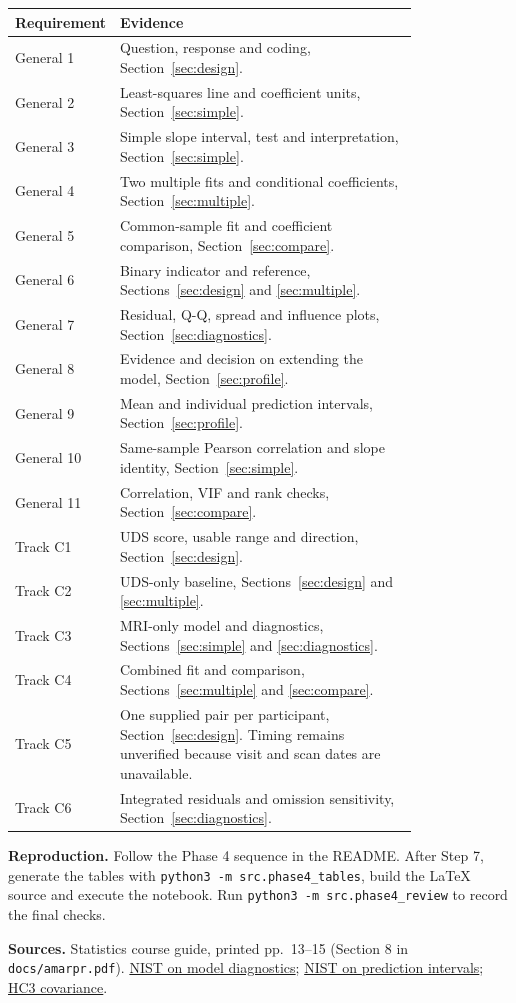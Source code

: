 \documentclass[11pt]{article}
\begin{document}
\begin{center}\small\setlength{\tabcolsep}{4pt}\renewcommand{\arraystretch}{1.13}
\begin{tabular}{@{}lp{0.80\linewidth}@{}}\toprule
Requirement & Evidence\\\midrule
General 1 & Question, response and coding, Section~\ref{sec:design}.\\
General 2 & Least-squares line and coefficient units, Section~\ref{sec:simple}.\\
General 3 & Simple slope interval, test and interpretation, Section~\ref{sec:simple}.\\
General 4 & Two multiple fits and conditional coefficients, Section~\ref{sec:multiple}.\\
General 5 & Common-sample fit and coefficient comparison, Section~\ref{sec:compare}.\\
General 6 & Binary indicator and reference, Sections~\ref{sec:design} and \ref{sec:multiple}.\\
General 7 & Residual, Q-Q, spread and influence plots, Section~\ref{sec:diagnostics}.\\
General 8 & Evidence and decision on extending the model, Section~\ref{sec:profile}.\\
General 9 & Mean and individual prediction intervals, Section~\ref{sec:profile}.\\
General 10 & Same-sample Pearson correlation and slope identity, Section~\ref{sec:simple}.\\
General 11 & Correlation, VIF and rank checks, Section~\ref{sec:compare}.\\
Track C1 & UDS score, usable range and direction, Section~\ref{sec:design}.\\
Track C2 & UDS-only baseline, Sections~\ref{sec:design} and \ref{sec:multiple}.\\
Track C3 & MRI-only model and diagnostics, Sections~\ref{sec:simple} and \ref{sec:diagnostics}.\\
Track C4 & Combined fit and comparison, Sections~\ref{sec:multiple} and \ref{sec:compare}.\\
Track C5 & One supplied pair per participant, Section~\ref{sec:design}. Timing remains unverified because visit and scan dates are unavailable.\\
Track C6 & Integrated residuals and omission sensitivity, Section~\ref{sec:diagnostics}.\\
\bottomrule\end{tabular}\end{center}

\textbf{Reproduction.} Follow the Phase 4 sequence in the README. After Step 7, generate the tables with \texttt{python3 -m src.phase4\_tables}, build the LaTeX source and execute the notebook. Run \texttt{python3 -m src.phase4\_review} to record the final checks.

\textbf{Sources.} Statistics course guide, printed pp.\ 13--15 (Section 8 in \texttt{docs/amarpr.pdf}). 
\href{https://www.itl.nist.gov/div898/handbook/pmd/section4/pmd44.htm}{NIST on model diagnostics};
\href{https://www.itl.nist.gov/div898/handbook/pmd/section5/pmd512.htm}{NIST on prediction intervals};
\href{https://www.statsmodels.org/stable/generated/statsmodels.regression.linear_model.OLSResults.HC3_se.html}{HC3 covariance}.
\end{document}
